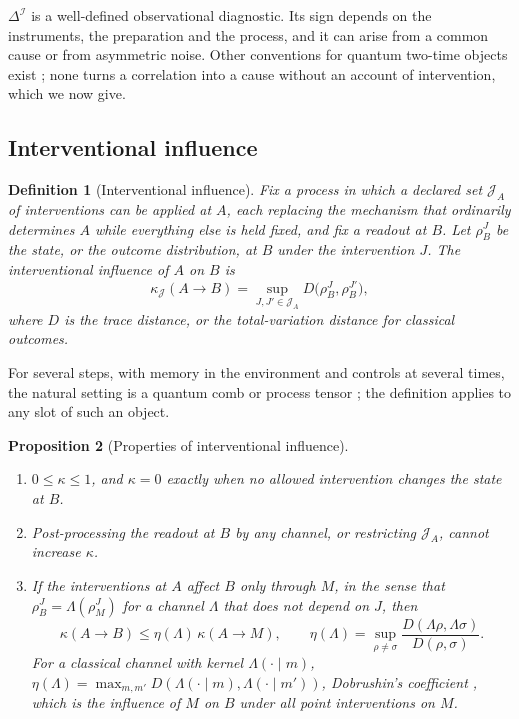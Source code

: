 \documentclass[11pt,a4paper]{article}
\newtheorem{definition}{Definition}[section]
\newtheorem{proposition}[definition]{Proposition}
\begin{document}
$\Delta^{\mathcal I}$ is a well-defined observational diagnostic. Its sign depends on the instruments, the preparation and the process, and it can arise from a common cause or from asymmetric noise. Other conventions for quantum two-time objects exist \cite{Fitzsimons2015,LeiferSpekkens2013}; none turns a correlation into a cause without an account of intervention, which we now give.

\subsection{Interventional influence}

\begin{definition}[Interventional influence]
\label{def:influence}
Fix a process in which a declared set $\mathcal J_A$ of interventions can be applied at $A$, each replacing the mechanism that ordinarily determines $A$ while everything else is held fixed, and fix a readout at $B$. Let $\rho_B^J$ be the state, or the outcome distribution, at $B$ under the intervention $J$. The interventional influence of $A$ on $B$ is
\[
\kappa_{\mathcal J}(A\to B)=\sup_{J,J'\in\mathcal J_A}D\bigl(\rho_B^J,\rho_B^{J'}\bigr),
\]
where $D$ is the trace distance, or the total-variation distance for classical outcomes.
\end{definition}

For several steps, with memory in the environment and controls at several times, the natural setting is a quantum comb or process tensor \cite{ChiribellaDArianoPerinotti2009,Pollock2018}; the definition applies to any slot of such an object.

\begin{proposition}[Properties of interventional influence]
\label{prop:influence}
\begin{enumerate}
\item $0\le\kappa\le1$, and $\kappa=0$ exactly when no allowed intervention changes the state at $B$.
\item Post-processing the readout at $B$ by any channel, or restricting $\mathcal J_A$, cannot increase $\kappa$.
\item If the interventions at $A$ affect $B$ only through $M$, in the sense that $\rho_B^J=\Lambda(\rho_M^J)$ for a channel $\Lambda$ that does not depend on $J$, then
\[
\kappa(A\to B)\le\eta(\Lambda)\,\kappa(A\to M),\qquad
\eta(\Lambda)=\sup_{\rho\ne\sigma}\frac{D(\Lambda\rho,\Lambda\sigma)}{D(\rho,\sigma)} .
\]
For a classical channel with kernel $\Lambda(\cdot\mid m)$, $\eta(\Lambda)=\max_{m,m'}D(\Lambda(\cdot\mid m),\Lambda(\cdot\mid m'))$, Dobrushin's coefficient \cite{Dobrushin1956}, which is the influence of $M$ on $B$ under all point interventions on $M$.
\end{enumerate}
\end{proposition}
\end{document}
